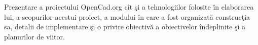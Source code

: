 Prezentare a proiectului OpenCad.org cît şi a tehnologiilor folosite în 
elaborarea lui, a scopurilor acestui proiect, a modului în care a fost
organizată construcţia sa, detalii de implementare şi o privire obiectivă a
obiectivelor îndeplinite şi a planurilor de viitor.
